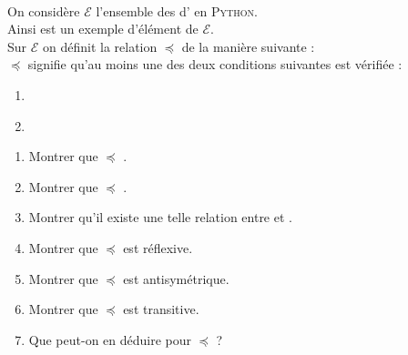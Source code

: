 \documentclass[a4paper,12pt,french]{article}
\begin{document}
\exo{}\\

On considère $\mathcal{E}$ l'ensemble des  d' en \textsc{Python}.\\
Ainsi \pythoninline{[1, 2]} est un exemple d'élément de $\mathcal{E}$.\\
Sur $\mathcal{E}$ on définit la relation $\preccurlyeq$ de la manière suivante :\\

 $\preccurlyeq$  signifie qu'au moins une des deux conditions suivantes est vérifiée :
\begin{enumerate}[\textbullet]
	\item 	 {}
	\item 	{}	\\
\end{enumerate}

\begin{enumerate}[\bfseries 1.]
	\item 	Montrer que \pythoninline{[2, 7]} $\preccurlyeq$ \pythoninline{[4, 1]}.
	\item 	Montrer que \pythoninline{[2, 7]} $\preccurlyeq$ \pythoninline{[2, 9]}.
    \item 	Montrer qu'il existe une telle relation entre \pythoninline{[5, -7]} et \pythoninline{[1, -3]}.
    
    \item	Montrer que $\preccurlyeq$ est réflexive.
    \item 	Montrer que $\preccurlyeq$ est antisymétrique.
    \item 	Montrer que $\preccurlyeq$ est transitive.
    \item 	Que peut-on en déduire pour $\preccurlyeq$ ?
\end{enumerate}
\end{document}
